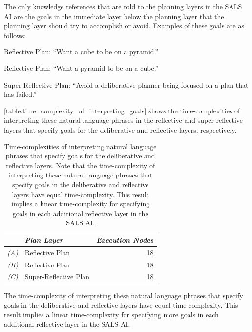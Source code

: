 The only knowledge references that are told to the planning layers in
the SALS AI are the goals in the immediate layer below the planning
layer that the planning layer should try to accomplish or avoid.
Examples of these goals are as follows:
\begin{packed_enumerate}
\item{Reflective Plan: ``Want a cube to be on a pyramid.''}
\item{Reflective Plan: ``Want a pyramid to be on a cube.''}
\item{Super-Reflective Plan: ``Avoid a deliberative planner being
  focused on a plan that has failed.''}
\end{packed_enumerate}
{\mbox{\autoref{table:time_complexity_of_interpreting_goals}}} shows
the time-complexities of interpreting these natural language phrases
in the reflective and super-reflective layers that specify goals for
the deliberative and reflective layers, respectively.
\begin{table}
\centering
\begin{tabular}{|r l|r|}
\hline
           &\emph{Plan Layer}     &\emph{Execution Nodes} \\
\hline
\emph{(A)} &Reflective Plan       & 18                    \\
\hline
\emph{(B)} &Reflective Plan       & 18                    \\
\hline
\emph{(C)} &Super-Reflective Plan & 18                    \\
\hline
\end{tabular}
\caption[Time-complexities of interpreting natural language phrases
  that specify goals for the deliberative and reflective
  layers.]{Time-complexities of interpreting natural language phrases
  that specify goals for the deliberative and reflective layers.  Note
  that the time-complexity of interpreting these natural language
  phrases that specify goals in the deliberative and reflective layers
  have equal time-complexity.  This result implies a linear
  time-complexity for specifying goals in each additional reflective
  layer in the SALS AI.}
\label{table:time_complexity_of_interpreting_goals}
\end{table}
The time-complexity of interpreting these natural language phrases
that specify goals in the deliberative and reflective layers have
equal time-complexity.  This result implies a linear time-complexity
for specifying more goals in each additional reflective layer in the
SALS AI.

